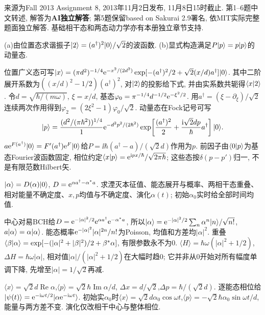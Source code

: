 来源为Fall 2013 Assignment 8, 2013年11月2日发布, 11月8日15时截止. 第1--6题中文转述, 解答为\textbf{AI独立解答}; 第5题保留based on Sakurai 2.9署名, 依MIT实际完整题面独立解答. 基础相干态和两态动力学亦有本册独立章节支持.
\begin{exercise}
(a)由位置态求谐振子$\lvert 2\rangle=(a^\dagger)^2\lvert 0\rangle/\sqrt2$的波函数. (b)显式构造满足$P\lvert p\rangle=p\lvert p\rangle$的动量态.
\end{exercise}
\begin{solution}
位置广义态可写$\lvert x\rangle=(\pi d^2)^{-1/4}\mathrm e^{-x^2/(2d^2)}\exp[-(a^\dagger)^2/2+\sqrt2(x/d)a^\dagger]\lvert 0\rangle$. 其中二阶展开系数为$((x/d)^2-1/2)(a^\dagger)^2$, 对$\lvert 2\rangle$的投影给下式, 并由实系数共轭得$\langle x\vert 2\rangle$. 令$d=\sqrt{\hbar/(m\omega)}$, $\xi=x/d$, 基态$\varphi_0=\pi^{-1/4}d^{-1/2}\mathrm e^{-\xi^2/2}$. 用$a^\dagger=(\xi-\partial_\xi)/\sqrt2$连续两次作用得到$\varphi_2=(2\xi^2-1)\varphi_0/\sqrt2$. 动量态在Fock记号可写
\[
\lvert p\rangle=\frac{(d^2/(\pi\hbar^2))^{1/4}}{1}
\mathrm e^{-d^2p^2/(2\hbar^2)}
\exp\!\left[\frac{(a^\dagger)^2}{2}+\frac{\mathrm i\sqrt2dp}{\hbar}a^\dagger\right]\lvert 0\rangle.
\]
$a\mathrm e^{F(a^\dagger)}\lvert 0\rangle=F'(a^\dagger)\mathrm e^F\lvert 0\rangle$给$P=\ii\hbar(a^\dagger-a)/(\sqrt2d)$作用为$p$. 前因子由$\langle 0\vert p\rangle$为基态Fourier波函数固定, 相位约定$\langle x\vert p\rangle=\mathrm e^{\mathrm i px/\hbar}/\sqrt{2\pi\hbar}$; 这些态按$\delta(p-p')$归一, 不是有限范数Hilbert矢.
\end{solution}
\begin{exercise}
$\lvert \alpha\rangle=D(\alpha)\lvert 0\rangle$, $D=\mathrm e^{\alpha a^\dagger-\alpha^*a}$. 求湮灭本征值、能态展开与概率、两相干态重叠、相对能量不确定度、$x,p$均值与不确定度、演化$\alpha(t)$; 初始$\alpha_0$实时给全部时间均值.
\end{exercise}
\begin{solution}
中心对易BCH给$D=\mathrm e^{-|\alpha|^2/2}\mathrm e^{\alpha a^\dagger}\mathrm e^{-\alpha^*a}$, 所以$\lvert \alpha\rangle=\mathrm e^{-|\alpha|^2/2}\sum_n\alpha^n\lvert n\rangle/\sqrt{n!}$, $a\lvert \alpha\rangle=\alpha\lvert \alpha\rangle$. 能态概率$\mathrm e^{-|\alpha|^2}|\alpha|^{2n}/n!$为Poisson, 均值和方差均$|\alpha|^2$. 重叠$\langle \beta\vert \alpha\rangle=\exp[-(|\alpha|^2+|\beta|^2)/2+\beta^*\alpha]$, 有限参数永不为0. $\langle H\rangle=\hbar\omega(|\alpha|^2+1/2)$,$\Delta H=\hbar\omega|\alpha|$, 相对值$|\alpha|/(|\alpha|^2+1/2)$在大幅时趋0; 它并非从0开始对所有幅度单调下降, 先增至$|\alpha|=1/\sqrt2$再减.

$\langle x\rangle=\sqrt2d\operatorname{Re}\alpha$,$\langle p\rangle=\sqrt2\hbar\operatorname{Im}\alpha/d$, $\Delta x=d/\sqrt2$,$\Delta p=\hbar/(\sqrt2d)$. 逐能态相位给$\lvert \psi(t)\rangle=\mathrm e^{-\mathrm i\omega t/2}\lvert \alpha\mathrm e^{-\mathrm i\omega t}\rangle$. 初始实$\alpha_0$时$\langle x\rangle=\sqrt2d\alpha_0\cos\omega t$,$\langle p\rangle=-\sqrt2\hbar\alpha_0\sin\omega t/d$, 能量与两方差不变. 演化仅改相干中心与整体相位.
\end{solution}
